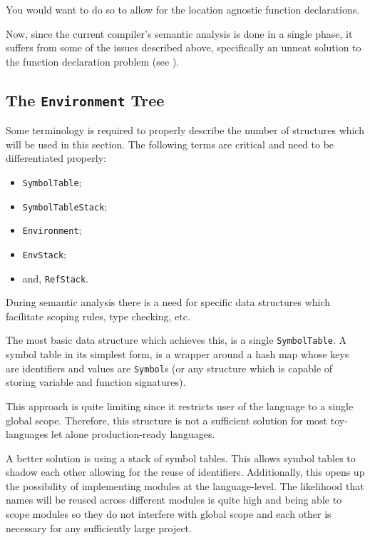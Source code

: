 You would want to do so to allow for the location agnostic
function declarations.

Now, since the current compiler's semantic analysis is done in a
single phase, it suffers from some of the issues described
above, specifically an unneat solution to the function
declaration problem (see ).

\subsection{The \texttt{Environment} Tree}

Some terminology is required to properly describe the number of
structures which will be used in this section. The following
terms are critical and need to be differentiated properly:

\begin{itemize}
    \item \texttt{SymbolTable};
    \item \texttt{SymbolTableStack};
    \item \texttt{Environment};
    \item \texttt{EnvStack};
    \item and, \texttt{RefStack}.
\end{itemize}

During semantic analysis there is a need for specific data
structures which facilitate scoping rules, type checking, etc.

The most basic data structure which achieves this, is a single
\texttt{SymbolTable}. A symbol table in its simplest form, is a
wrapper around a hash map whose keys are identifiers and values
are \texttt{Symbol}s (or any structure which is capable of
storing variable and function signatures).

This approach is quite limiting since it restricts user of the
language to a single global scope. Therefore, this structure is
not a sufficient solution for most toy-languages let alone
production-ready languages.

A better solution is using a stack of symbol tables. This allows
symbol tables to shadow each other allowing for the reuse of
identifiers. Additionally, this opens up the possibility of
implementing modules at the language-level. The likelihood that
names will be reused across different modules is quite high and
being able to scope modules so they do not interfere with global
scope and each other is necessary for any sufficiently large
project.

